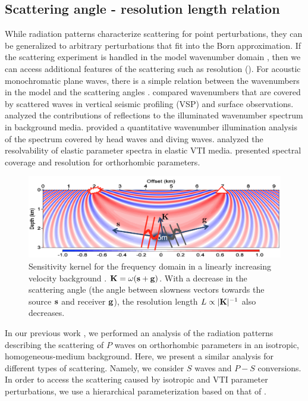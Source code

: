 \subsection{Scattering angle - resolution length relation}

While radiation patterns characterize scattering for point perturbations, they 
can be generalized to arbitrary perturbations that fit into the Born 
approximation. If the scattering experiment is handled in the model wavenumber domain \citep{devaney1984}, then
we can access additional features of the scattering such as resolution ().
%
For acoustic monochromatic plane waves, there is a simple relation between 
the wavenumbers in the model and the scattering angles \citep{ewald1969,devaney1984}. 
\cite{wu:11} compared wavenumbers that are covered by scattered waves in vertical seismic profiling (VSP) 
and surface observations. \cite{mora1989} analyzed the contributions of reflections to the illuminated wavenumber spectrum in background media. \cite{kazei2013gp} 
provided a quantitative wavenumber illumination analysis of the spectrum covered by head waves and diving waves. \cite{podgornova,podgornova2018} analyzed 
the resolvability of elastic parameter spectra in elastic VTI media. 
\cite{kazei2018} presented spectral coverage and resolution for orthorhombic 
parameters. 
%
\begin{figure}
	\centering
	\includegraphics[width=0.9\linewidth]{Fig/Ksg}
	\caption{Sensitivity kernel for the frequency domain in a linearly increasing velocity background \citep{alkhalifah2014scattering,kazei2016}. $\mathbf{K} = \omega(\mathbf{s}+\mathbf{g})$. With a decrease in the scattering angle (the angle between slowness vectors towards the source $\mathbf{s}$ and receiver $\mathbf{g}$), the resolution length $L \propto |\mathbf{K}|^{-1}$ also decreases.}
	\label{fig:ksg}
\end{figure}

In our previous work \citep{kazei2018}, we performed an analysis of the 
radiation patterns describing the scattering of $P$ waves on orthorhombic 
parameters in an isotropic, homogeneous-medium background. Here, we present a similar 
analysis for different types of scattering. Namely, we consider $S$ waves and 
$P-S$ conversions. In order to access the scattering caused by isotropic and VTI 
parameter perturbations, we use a hierarchical parameterization based on that of 
\cite{juwon2016, kazei2018}.